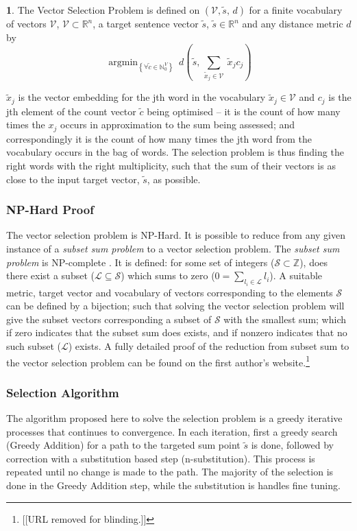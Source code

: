 \documentclass[11pt]{article}
\theoremstyle{plain}
\theoremstyle{definition}
\newtheorem{defn}[thm]{\protect\definitionname}
\providecommand{\definitionname}{Definition}
\DeclareMathOperator*{\argmin}{argmin}
\begin{document}
\renewcommand{\c}{\tilde{c}}
\newcommand{\s}{\tilde{s}}
\newcommand{\x}{\tilde{x}}
\renewcommand{\t}{\tilde{t}}
\newcommand{\N}{\mathbb{N}}
\newcommand{\R}{\mathbb{R}}
\newcommand{\V}{\mathcal{V}}

\begin{defn}{The Vector Selection Problem}
	is defined on $(\V, \s,\,d)$ for a finite vocabulary of vectors $\V$, $\V\subset{\R}^{n}$, a target sentence vector $ \s$, $ \s\in\R^{n}$ and any distance metric $d$ by
		\[
		\argmin_{\left\{ \forall\c\in\N_{0}^{V}\right\} }\:d( \s,\,\sum_{\x_j\in\V}\:\x_{j}c_{j})
		\]
						
		$\x_{j}$ is the vector embedding for the jth word in the vocabulary
		$\x_{j}\in\V$ and $c_j$ is the jth element of the count vector $\c$ being optimised -- it is the count of how many times the $x_j$ occurs in approximation to the sum being assessed; and correspondingly it is the count of how many times the jth word from the vocabulary occurs in the bag of words.
		The selection problem is thus finding the right words with the right multiplicity, such that the sum of their vectors is as close to the input target vector, $\s$, as possible.
\end{defn}

\subsubsection{NP-Hard Proof}
The vector selection problem is NP-Hard. It is possible to reduce from any given instance of a \emph{subset sum problem} to a vector selection problem. The \emph{subset sum problem} is NP-complete \parencite{karp1972reducibility}. It is defined: for some set of integers ($\mathcal{S}\subset\mathbb{Z}$), does there exist a subset ($\mathcal{L}\subseteq\mathcal{S}$) which sums to zero ($0=\sum_{l_i\in \mathcal{L}} l_i$).  A suitable metric, target vector and  vocabulary of vectors corresponding to the elements $\mathcal{S}$ can be defined by a bijection; such that solving the vector selection problem will give the subset vectors corresponding a subset of $\mathcal{S}$ with the smallest sum; which if zero indicates that the subset sum does exists, and if nonzero indicates that no such subset ($\mathcal{L}$) exists. A fully detailed proof of the reduction from subset sum to the vector selection problem can be found on the first author's website.\footnote{[[URL removed for blinding.]]}

\subsubsection{Selection Algorithm}
The algorithm proposed here to solve the selection problem is a greedy iterative processes that continues to convergence. In each iteration, first a greedy search (Greedy Addition) for a path to the targeted sum point $\s$ is done, followed by correction with a substitution based step (n-substitution). This process is repeated until no change is made to the path. The majority of the selection is done in the Greedy Addition step, while the substitution is handles fine tuning.
\end{document}
